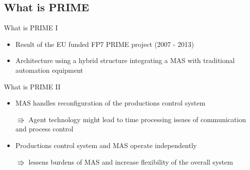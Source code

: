 \documentclass[12pt]{beamer}
\begin{document}
\subsection{What is PRIME}
\begin{frame}{What is PRIME I}
	\begin{itemize}
		\item Result of the EU funded FP7 PRIME project (2007 - 2013)
		\newline
	 
		\item Architecture using a hybrid structure integrating a MAS with traditional automation equipment
		\newline

	\end{itemize}
\end{frame}

\begin{frame}{What is PRIME II}
	\begin{itemize}
		\item MAS handles reconfiguration of the productions control system
		\newline
				
		$\Rrightarrow$ Agent technology might lead to time processing issues of communication and process control
		\newline
		
		\item Productions control system and MAS operate independently
		\newline
		
		$\Rrightarrow$ lessens burdens of MAS and increase flexibility of the overall system
	\end{itemize}
\end{frame}
\end{document}
